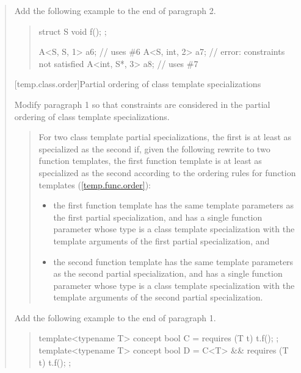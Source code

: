 \begin{quote}
Add the following example to the end of paragraph 2.

\begin{quote}
\begin{addedblock}
\enterexample
\begin{codeblock}
struct S { void f(); };

A<S, S, 1>    a6; // uses \#6
A<S, int, 2>  a7; // error: constraints not satisfied
A<int, S*, 3> a8; // uses \#7
\end{codeblock}
\exitexample
\end{addedblock}
\end{quote}


[temp.class.order]{Partial ordering of class template specializations}

Modify paragraph 1 so that constraints are considered in the
partial ordering of class template specializations. 

\begin{quote}
\pnum
For two class template partial specializations, the first is 
at least as specialized as the second if, given the following 
rewrite to two function templates, the first function template 
is at least as specialized as the second according to the ordering 
rules for function templates 
(\ref{temp.func.order}):
% 
\begin{itemize}
\item the first function template has the same template 
parameters  
as the first partial specialization, and has a single function parameter 
whose type is a class template specialization with the template
arguments of the first partial specialization, and

\item the second function template has the same template 
parameters  
as the second partial specialization, and has a single function parameter 
whose type is a class template specialization with the template
arguments of the second partial specialization.
\end{itemize}
\end{quote}

Add the following example to the end of paragraph 1.

\begin{quote}
\begin{addedblock}
\enterexample
\begin{codeblock}
template<typename T> concept bool C = requires (T t) { t.f(); };
template<typename T> concept bool D = C<T> && requires (T t) { t.f(); };



\end{codeblock}
\end{addedblock}
\end{quote}
\end{quote}
